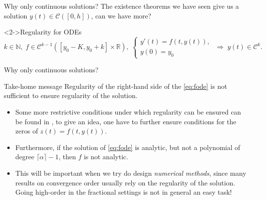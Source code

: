 \documentclass[aspectratio=169,xcolor=dvipsnames]{beamer}
\begin{document}
\begin{frame}{Why only continuous solutions?}
The existence theorems we have seen give us a solution $y(t) \in \mathcal{C}([0,h])$, can we have more?

\begin{block}<2->{Regularity for ODEs}
\[k \in \mathbb{N}, \; f \in \mathcal{C}^{k-1}([y_0 - K, y_0 + k]\times \mathbb{R}), \; \begin{cases} y'(t) = f(t,y(t)),\\y(0) = y_0 \end{cases} \; \Rightarrow \; y(t) \in \mathcal{C}^k.\]
\end{block}

\end{frame}

\begin{frame}{Why only continuous solutions?}

\begin{block}{\faLuggageCart\;Take-home message}
Regularity of the right-hand side of the \eqref{eq:fode} is \alert{not sufficient} to ensure regularity of the solution.
\end{block}

\begin{itemize}
	\item[{\faFile[regular]}] Some more restrictive conditions under which regularity can be ensured can be found in \parencite{DiethelmRegularity}, to give an idea, one have to further ensure conditions for the zeros of $z(t) = f(t,y(t))$.
	\item Furthermore, if the solution of \eqref{eq:fode} is analytic, but not a polynomial of degree $\lceil \alpha \rceil - 1$, then $f$ is not analytic.
	\item<2> This will be important when we try do design \emph{numerical methods}, since many results on convergence order usually rely on the regularity of the solution. Going high-order in the fractional settings is not in general an easy task!
\end{itemize}

\end{frame}
\end{document}
